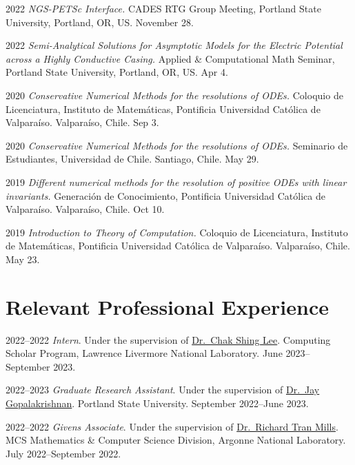 \documentclass[12pt,letterpaper]{report}
\begin{document}
    \begin{tablist}

	\item[2022] \tab \emph{NGS-PETSc Interface.} CADES RTG Group Meeting, Portland State University, Portland, OR, US. November 28.

	\item[2022] \tab \emph{Semi-Analytical Solutions for Asymptotic Models for the Electric Potential across a Highly Conductive Casing.} Applied \& Computational Math Seminar, Portland State University, Portland, OR, US. Apr 4.

        \item[2020] \tab \emph{Conservative Numerical Methods for the resolutions of ODEs.} Coloquio de Licenciatura, Instituto de Matem\'aticas, Pontificia Universidad Cat\'olica de Valpara\'iso. Valpara\'iso, Chile. Sep 3.
         
        \item[2020] \tab \emph{Conservative Numerical Methods for the resolutions of ODEs.} Seminario de Estudiantes, Universidad de Chile. Santiago, Chile. May 29.

    	\item[2019] \tab \emph{Different numerical methods for the resolution of positive ODEs with linear invariants.} Generaci\'on de Conocimiento, Pontificia Universidad Cat\'olica de Valpara\'iso. Valpara\'iso, Chile. Oct 10.
    
    	\item[2019] \tab \emph{Introduction to Theory of Computation.} Coloquio de Licenciatura, Instituto de Matem\'aticas, Pontificia Universidad Cat\'olica de Valpara\'iso. Valpara\'iso, Chile. May 23.
    	
    \end{tablist}


    \section*{Relevant Professional Experience}

	\begin{tablist}

        \item[2022--2022] \emph{Intern}. Under the supervision of \href{https://people.llnl.gov/lee1029}{Dr.~Chak Shing Lee}. Computing Scholar Program, Lawrence Livermore National Laboratory. June 2023--September 2023.

        \item[2022--2023] \emph{Graduate Research Assistant}. Under the supervision of \href{https://web.pdx.edu/~gjay/}{Dr.~Jay Gopalakrishnan}. Portland State University. September 2022--June 2023.

        \item[2022--2022] \emph{Givens Associate}. Under the supervision of \href{https://climatemodeling.org/~rmills/}{Dr.~Richard Tran Mills}. MCS Mathematics \& Computer Science Division, Argonne National Laboratory. July 2022--September 2022.

	\end{tablist}
\end{document}
